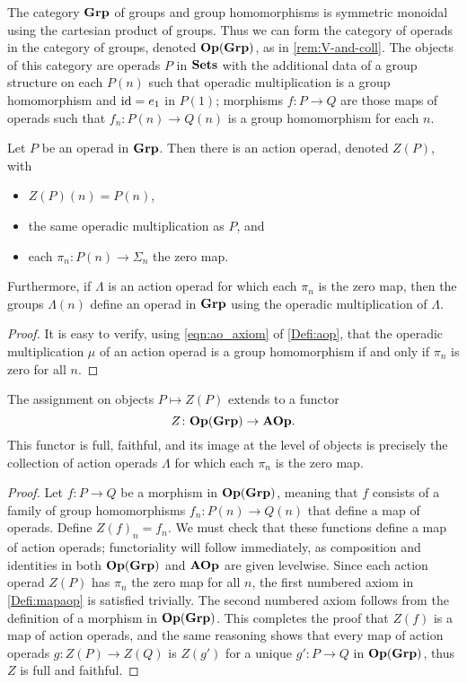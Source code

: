 \begin{rem}\label{rem:op-in-grp}
The category $\mathbf{Grp}$ of groups and group homomorphisms is symmetric monoidal using the cartesian product of groups.
Thus we can form the category of operads in the category of groups, denoted $\mathbf{Op}(\mathbf{Grp})$, as in \cref{rem:V-and-coll}.
The objects of this category are operads $P$ in $\mathbf{Sets}$ with the additional data of a group structure on each $P(n)$ such that operadic multiplication is a group homomorphism and $\textrm{id} = e_1$ in $P(1)$; morphisms $f \colon P \to Q$ are those maps of operads such that $f_n \colon P(n) \to Q(n)$ is a group homomorphism for each $n$.
\end{rem}

\begin{prop}\label{prop:Z-obj}
Let $P$ be an operad in $\mathbf{Grp}$. Then there is an action operad, denoted $Z(P)$, with
\begin{itemize}
\item $Z(P)(n) = P(n)$,
\item the same operadic multiplication as $P$, and
\item each $\pi_n \colon P(n) \to \Sigma_n$ the zero map.
\end{itemize}
Furthermore, if $\Lambda$ is an action operad for which each $\pi_n$ is the zero map, then the groups $\Lambda(n)$ define an operad in $\mathbf{Grp}$ using the operadic multiplication of $\Lambda$.
\end{prop}
\begin{proof}
It is easy to verify, using \cref{eqn:ao_axiom} of \cref{Defi:aop}, that the operadic multiplication $\mu$ of an action operad is a group homomorphism if and only if $\pi_{n}$ is zero for all $n$.
\end{proof}

\begin{prop}\label{prop:Z}
The assignment on objects $P \mapsto Z(P)$ extends to a functor 
\[
Z \colon  \mathbf{Op}(\mathbf{Grp}) \rightarrow \mathbf{AOp}.
\]
This functor is full, faithful, and its image at the level of objects is precisely the collection of action operads $\Lambda$ for which each $\pi_n$ is the zero map.
\end{prop}
\begin{proof}
Let $f \colon P \to Q$ be a morphism in $\mathbf{Op}(\mathbf{Grp})$, meaning that $f$ consists of a family of group homomorphisms $f_n \colon P(n) \to Q(n)$ that define a map of operads.
Define $Z(f)_n = f_n$. We must check that these functions define a map of action operads; functoriality will follow immediately, as composition and identities in both $\mathbf{Op}(\mathbf{Grp})$ and $\mathbf{AOp}$ are given levelwise.
Since each action operad $Z(P)$ has $\pi_n$ the zero map for all $n$, the first numbered axiom in \cref{Defi:mapaop} is satisfied trivially.
The second numbered axiom follows from the definition of a morphism in $\mathbf{Op}(\mathbf{Grp})$.
This completes the proof that $Z(f)$ is a map of action operads, and the same reasoning shows that every map of action operads $g \colon Z(P) \to Z(Q)$ is $Z(g')$ for a unique $g' \colon P \to Q$ in $\mathbf{Op}(\mathbf{Grp})$, thus $Z$ is full and faithful.
\end{proof}

